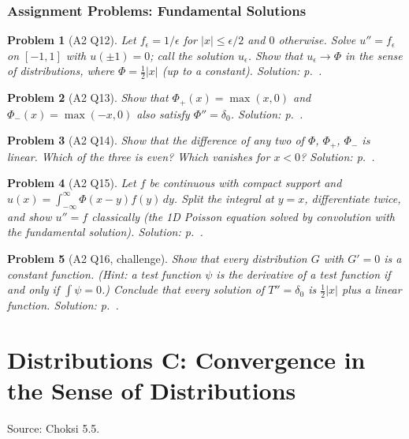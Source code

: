 \documentclass{article}
\newtheorem{problem}{Problem}
\begin{document}
\subsubsection*{Assignment Problems: Fundamental Solutions}
\begin{problem}[A2 Q12]\label{prob:a2-d1}
    Let $f_\epsilon = 1/\epsilon$ for $|x| \leq \epsilon/2$ and $0$ otherwise. Solve $u'' = f_\epsilon$ on $[-1,1]$ with $u(\pm1) = 0$; call the solution $u_\epsilon$. Show that $u_\epsilon \to \Phi$ in the sense of distributions, where $\Phi = \frac12|x|$ (up to a constant).
    \hfill \emph{Solution: p.~\pageref{sol:a2-d1}.}
\end{problem}
\begin{problem}[A2 Q13]\label{prob:a2-d2}
    Show that $\Phi_+(x) = \max(x,0)$ and $\Phi_-(x) = \max(-x,0)$ also satisfy $\Phi'' = \delta_0$.
    \hfill \emph{Solution: p.~\pageref{sol:a2-d2}.}
\end{problem}
\begin{problem}[A2 Q14]\label{prob:a2-d3}
    Show that the difference of any two of $\Phi$, $\Phi_+$, $\Phi_-$ is linear. Which of the three is even? Which vanishes for $x < 0$?
    \hfill \emph{Solution: p.~\pageref{sol:a2-d3}.}
\end{problem}
\begin{problem}[A2 Q15]\label{prob:a2-d4}
    Let $f$ be continuous with compact support and $u(x) = \int_{-\infty}^\infty \Phi(x-y)f(y)\,dy$. Split the integral at $y = x$, differentiate twice, and show $u'' = f$ classically (the 1D Poisson equation solved by convolution with the fundamental solution).
    \hfill \emph{Solution: p.~\pageref{sol:a2-d4}.}
\end{problem}
\begin{problem}[A2 Q16, challenge]\label{prob:a2-d5}
    Show that every distribution $G$ with $G' = 0$ is a constant function. (Hint: a test function $\psi$ is the derivative of a test function if and only if $\int\psi = 0$.) Conclude that every solution of $T'' = \delta_0$ is $\frac12|x|$ plus a linear function.
    \hfill \emph{Solution: p.~\pageref{sol:a2-d5}.}
\end{problem}



\section{Distributions C: Convergence in the Sense of Distributions}\label{sec:distC}
Source: Choksi 5.5.
\end{document}
